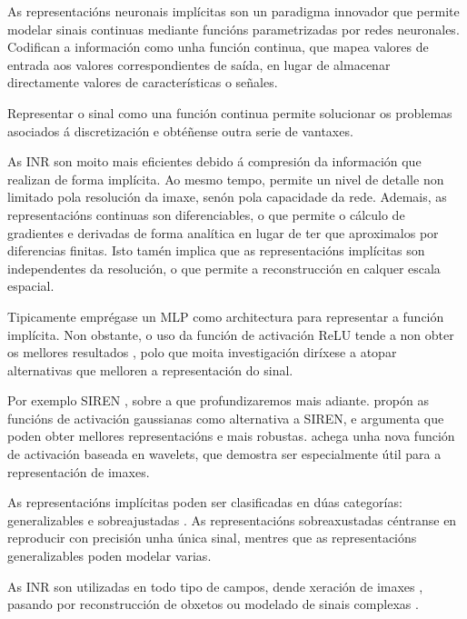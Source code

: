  As representacións neuronais implícitas son un paradigma innovador que permite modelar sinais continuas mediante funcións parametrizadas por redes neuronales.
 Codifican a información como unha función continua, que mapea valores de entrada aos valores correspondientes de saída, en lugar de almacenar directamente valores de características o señales.

Representar o sinal como una función continua permite solucionar os problemas asociados á discretización e obtéñense outra serie de vantaxes.

As INR son moito mais eficientes debido á compresión da información que realizan de forma implícita. Ao mesmo tempo, permite un nivel de detalle non limitado pola resolución da imaxe, senón pola capacidade da rede. 
 Ademais, as representacións continuas son diferenciables, o que permite o cálculo de gradientes e derivadas de forma analítica en lugar de ter que aproximalos por diferencias finitas.
 Isto tamén implica que as representacións implícitas son independentes da resolución, o que permite a reconstrucción en calquer escala espacial.
 
Tipicamente emprégase un MLP como architectura para representar a función implícita. Non obstante, o uso da función de activación ReLU tende a non obter os mellores resultados \cite{rahaman2019spectralbiasneuralnetworks},
polo que moita investigación diríxese a atopar alternativas que melloren a representación do sinal. \cite{essakine2024standimplicitneuralrepresentations}

Por exemplo SIREN \cite{sitzmann2020implicitneuralrepresentationsperiodic}, sobre a que profundizaremos mais adiante.
\cite{ramasinghe2022periodicityunifyingframeworkactivations} propón as funcións de activación gaussianas como alternativa a SIREN, e argumenta que poden obter mellores representacións e mais robustas.
\cite{saragadam2023wirewaveletimplicitneural} achega unha nova función de activación baseada en wavelets, que demostra ser especialmente útil para a representación de imaxes.

As representacións implícitas poden ser clasificadas en dúas categorías: generalizables e sobreajustadas \cite{yu2024neuraltrajectorymodelimplicit}. 
As representacións sobreaxustadas céntranse en reproducir con precisión unha única sinal, mentres que as representacións generalizables poden modelar varias.

As INR son utilizadas en todo tipo de campos, dende xeración de imaxes \cite{reddy2022multiimplicitneuralrepresentationfonts}, pasando por
reconstrucción de obxetos \cite{mildenhall2020nerfrepresentingscenesneural} \cite{mescheder2019occupancynetworkslearning3d} ou modelado de sinais complexas \cite{wu2021iremhighresolutionmagneticresonance}.

